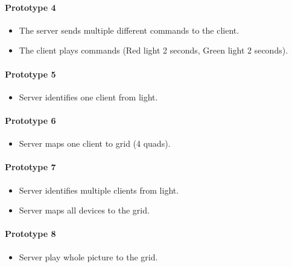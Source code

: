 \documentclass{article}
\begin{document}
\paragraph{Prototype 4}
\begin{itemize}
	\item The server sends multiple different commands to the client.
	\item The client plays commands (Red light 2 seconds, Green light 2 seconds).
\end{itemize}

\paragraph{Prototype 5}
\begin{itemize}
	\item Server identifies one client from light.
\end{itemize}

\paragraph{Prototype 6}
\begin{itemize}
	\item Server maps one client to grid (4 quads).
\end{itemize}

\paragraph{Prototype 7}
\begin{itemize}
	\item Server identifies multiple clients from light.
	\item Server maps all devices to the grid.
\end{itemize}

\paragraph{Prototype 8}
\begin{itemize}
	\item Server play whole picture to the grid.
\end{itemize}
\end{document}
